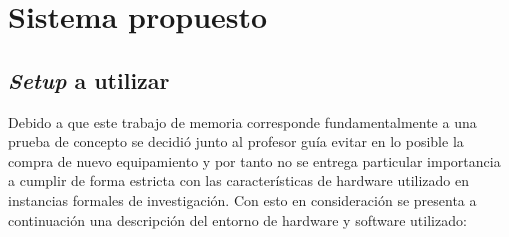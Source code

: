 \documentclass[\main/main.tex]{subfiles}
\begin{document}
\chapter{Sistema propuesto}
\label{cha:03_sistema_propuesto}
	\section{\textit{Setup} a utilizar}
	\label{sec:03_setup}
		Debido a que este trabajo de memoria corresponde fundamentalmente a una prueba de concepto se decidió junto al profesor guía evitar en lo posible la compra de nuevo equipamiento y por tanto no se entrega particular importancia a cumplir de forma estricta con las características de hardware utilizado en instancias formales de investigación. Con esto en consideración se presenta a continuación una descripción del entorno de hardware y software utilizado:
		\begin{table}[H]\begin{center}\footnotesize{
			\caption{Hardware y software utilizado en el desarrollo.}
			\label{tbl:03_hs_selection}
		}\end{center}\end{table}
\end{document}
